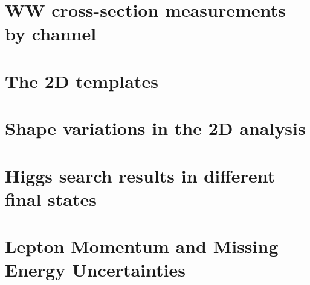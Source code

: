 \documentclass{cmspaper}
\begin{document}
%   

\section{WW cross-section measurements by channel}
     \label{app:appendix_wwxsec}
     
\clearpage

\section{The 2D templates}
     \label{app:appendix_2dtemplate}
     
\clearpage

\section{Shape variations in the 2D analysis}
     \label{app:appendix_shapevar_2d}
     
\clearpage

\section{Higgs search results in different final states}
     \label{app:appendix_limits_bychannel}
     
\clearpage

%     


\section{Lepton Momentum and Missing Energy Uncertainties}
     \label{app:lep_met_res}
     
\end{document}
